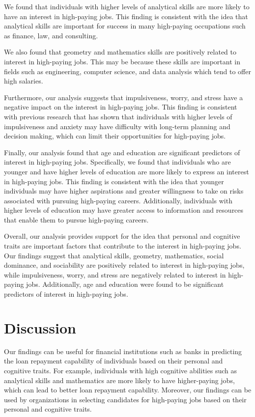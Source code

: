 \documentclass[
]{article}
\begin{document}
We found that individuals with higher levels of analytical skills are
more likely to have an interest in high-paying jobs. This finding is
consistent with the idea that analytical skills are important for
success in many high-paying occupations such as finance, law, and
consulting.

We also found that geometry and mathematics skills are positively
related to interest in high-paying jobs. This may be because these
skills are important in fields such as engineering, computer science,
and data analysis which tend to offer high salaries.

Furthermore, our analysis suggests that impulsiveness, worry, and stress
have a negative impact on the interest in high-paying jobs. This finding
is consistent with previous research that has shown that individuals
with higher levels of impulsiveness and anxiety may have difficulty with
long-term planning and decision making, which can limit their
opportunities for high-paying jobs.

Finally, our analysis found that age and education are significant
predictors of interest in high-paying jobs. Specifically, we found that
individuals who are younger and have higher levels of education are more
likely to express an interest in high-paying jobs. This finding is
consistent with the idea that younger individuals may have higher
aspirations and greater willingness to take on risks associated with
pursuing high-paying careers. Additionally, individuals with higher
levels of education may have greater access to information and resources
that enable them to pursue high-paying careers.

Overall, our analysis provides support for the idea that personal and
cognitive traits are important factors that contribute to the interest
in high-paying jobs. Our findings suggest that analytical skills,
geometry, mathematics, social dominance, and sociability are positively
related to interest in high-paying jobs, while impulsiveness, worry, and
stress are negatively related to interest in high-paying jobs.
Additionally, age and education were found to be significant predictors
of interest in high-paying jobs.

\hypertarget{discussion}{%
\section{Discussion}\label{discussion}}

Our findings can be useful for financial institutions such as banks in
predicting the loan repayment capability of individuals based on their
personal and cognitive traits. For example, individuals with high
cognitive abilities such as analytical skills and mathematics are more
likely to have higher-paying jobs, which can lead to better loan
repayment capability. Moreover, our findings can be used by
organizations in selecting candidates for high-paying jobs based on
their personal and cognitive traits.
\end{document}
